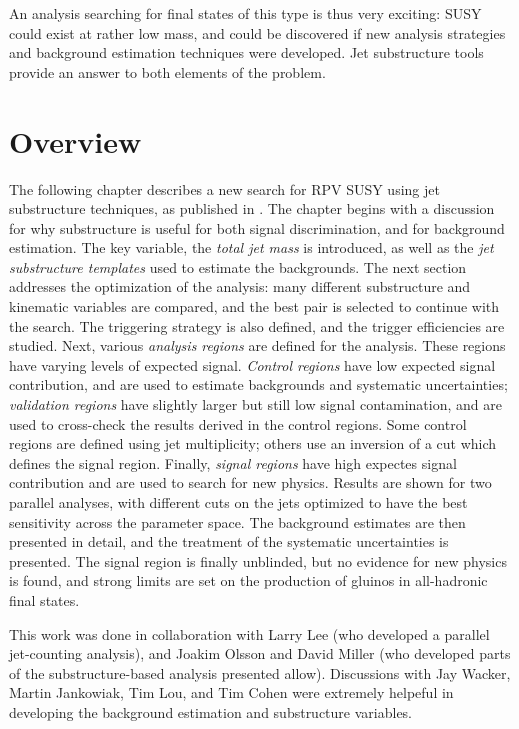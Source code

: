An analysis searching for final states of this type is thus very exciting: SUSY could exist at rather low mass, and could be discovered if new analysis strategies and background estimation techniques were developed. Jet substructure tools provide an answer to both elements of the problem. 

\section{Overview}

The following chapter describes a new search for RPV SUSY using jet substructure techniques, as published in \cite{RPVSUSY}.  The chapter begins with a discussion for why substructure is useful for both signal discrimination, and for background estimation. The key variable, the \textit{total jet mass} is introduced, as well as the \textit{jet substructure templates} used to estimate the backgrounds. The next section addresses the optimization of the analysis: many different substructure and kinematic variables are compared, and the best pair is selected to continue with the search. The triggering strategy is also defined, and the trigger efficiencies are studied. Next, various \textit{analysis regions} are defined for the analysis. These regions have varying levels of expected signal. \textit{Control regions} have low expected signal contribution, and are used to estimate backgrounds and systematic uncertainties; \textit{validation regions} have slightly larger but still low signal contamination, and are used to cross-check the results derived in the control regions. Some control regions are defined using jet multiplicity; others use an inversion of a cut which defines the signal region.  Finally, \textit{signal regions} have high expectes signal contribution and are used to search for new physics. Results are shown for two parallel analyses, with different \pt cuts on the jets optimized to have the best sensitivity across the parameter space. The background estimates are then presented in detail, and the treatment of the systematic uncertainties is presented. The signal region is finally unblinded, but no evidence for new physics is found, and strong limits are set on the production of gluinos in all-hadronic final states. 

This work was done in collaboration with Larry Lee (who developed a parallel jet-counting analysis), and Joakim Olsson and David Miller (who developed parts of the substructure-based analysis presented allow). Discussions with Jay Wacker, Martin Jankowiak, Tim Lou, and Tim Cohen were extremely helpeful in developing the background estimation and substructure variables.

